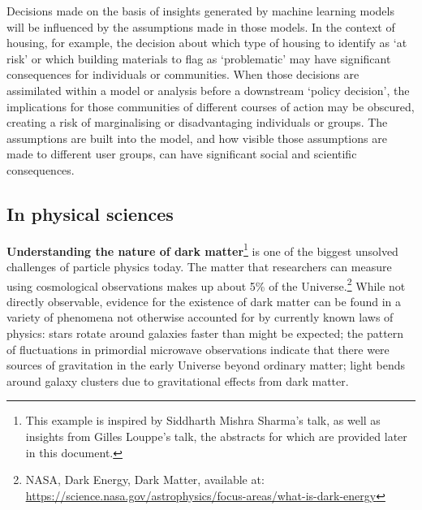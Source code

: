 Decisions made on the basis of insights generated by machine learning
models will be influenced by the assumptions made in those models. In
the context of housing, for example, the decision about which type of
housing to identify as `at risk' or which building materials to flag as
`problematic' may have significant consequences for individuals or
communities. When those decisions are assimilated within a model or
analysis before a downstream `policy decision', the implications for
those communities of different courses of action may be obscured,
creating a risk of marginalising or disadvantaging individuals or
groups. The assumptions are built into the model, and how visible those
assumptions are made to different user groups, can have significant
social and scientific consequences.

\hypertarget{in-physical-sciences}{%
\subsection{In physical sciences}\label{in-physical-sciences}}

\textbf{Understanding the nature of dark matter}\footnote{This example
  is inspired by Siddharth Mishra Sharma's talk, as well as insights
  from Gilles Louppe's talk, the abstracts for which are provided later
  in this document.} is one of the biggest unsolved challenges of
particle physics today. The matter that researchers can measure using
cosmological observations makes up about 5\% of the Universe.\footnote{NASA,
  Dark Energy, Dark Matter, available at:
  \href{https://science.nasa.gov/astrophysics/focus-areas/what-is-dark-energy}{\uline{https://science.nasa.gov/astrophysics/focus-areas/what-is-dark-energy}}}
While not directly observable, evidence for the existence of dark matter
can be found in a variety of phenomena not otherwise accounted for by
currently known laws of physics: stars rotate around galaxies faster
than might be expected; the pattern of fluctuations in primordial
microwave observations indicate that there were sources of gravitation
in the early Universe beyond ordinary matter; light bends around galaxy
clusters due to gravitational effects from dark matter.~

